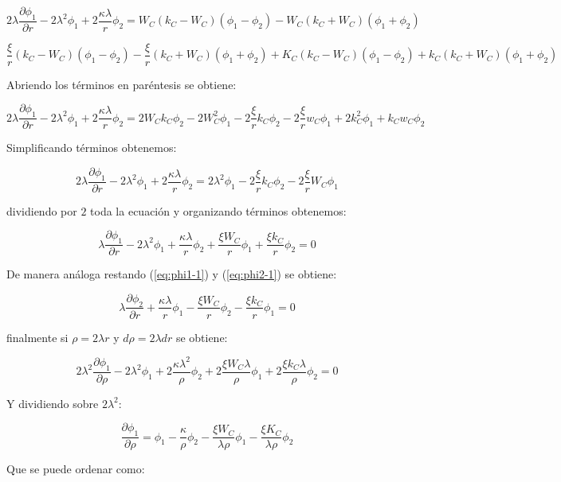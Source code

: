 \documentclass[a4paper, 12pt]{article} %
\begin{document}
\[
2 \lambda \dfrac{\partial \phi_1}{\partial r} -  2 \lambda^2  \phi_1 + 2\dfrac{\kappa \lambda}{r}\phi_2
= W_C(k_C - W_C)(\phi_1 - \phi_2) - W_C(k_C + W_C)(\phi_1 + \phi_2)
\]

\[
\dfrac{\xi}{r}(k_C - W_C)(\phi_1 - \phi_2) - \dfrac{\xi}{r}(k_C + W_C)(\phi_1 + \phi_2)
+ K_C (k_C - W_C)(\phi_1 - \phi_2) + k_C (k_C + W_C)(\phi_1 + \phi_2)
\]

Abriendo los t\'erminos en par\'entesis se obtiene:

\[
2 \lambda \dfrac{\partial \phi_1}{\partial r} -  2 \lambda^2  \phi_1 + 2\dfrac{\kappa \lambda}{r}\phi_2
= 2W_Ck_C\phi_2 - 2W_C^2 \phi_1 - 2 \dfrac{\xi}{r}k_C \phi_2 - 2 \dfrac{\xi}{r}w_C \phi_1 
+ 2 k_C^2 \phi_1  + k_C w_C \phi_2
\]

Simplificando t\'erminos obtenemos:

\[
 2 \lambda \dfrac{\partial \phi_1}{\partial r} -  2 \lambda^2  \phi_1 + 2\dfrac{\kappa \lambda}{r}\phi_2
= 2\lambda^2 \phi_1 - 2 \dfrac{\xi}{r}k_C \phi_2 - 2\dfrac{\xi}{r}W_C \phi_1
\]

dividiendo por $2$ toda la ecuaci\'on y organizando t\'erminos obtenemos:

\begin{equation}
\lambda \dfrac{\partial \phi_1}{\partial r} - 2 \lambda^2 \phi_1 + \dfrac{\kappa \lambda}{r} \phi_2  + \dfrac{\xi W_C}{r} \phi_1 
+ \dfrac{\xi k_C}{r}\phi_2 = 0
\end{equation}

De manera an\'aloga restando (\ref{eq:phi1-1}) y  (\ref{eq:phi2-1}) se obtiene:

\begin{equation}
\lambda \dfrac{\partial \phi_2}{\partial r}  + \dfrac{\kappa \lambda}{r} \phi_1  - \dfrac{\xi W_C}{r} \phi_2 - \dfrac{\xi k_C}{r} \phi_1 = 0
\end{equation}

finalmente si $\rho = 2\lambda r$ y $d\rho = 2 \lambda dr$ se obtiene:

\[
2\lambda^2 \dfrac{\partial \phi_1}{\partial \rho} - 2\lambda^2 \phi_1 + 2 \dfrac{\kappa \lambda^2 }{\rho} \phi_2 
+ 2 \dfrac{\xi W_C \lambda}{\rho}\phi_1 + 2\dfrac{\xi k_C \lambda }{\rho}\phi_2 = 0
\]

Y dividiendo sobre $2\lambda^2$:

\[
\dfrac{\partial \phi_1}{\partial \rho} = \phi_1 - \dfrac{\kappa}{\rho}\phi_2 - \dfrac{\xi W_C}{\lambda \rho }\phi_1 - \dfrac{\xi K_C}{\lambda \rho}
\phi_2 
\]

Que se puede ordenar como:
\end{document}
